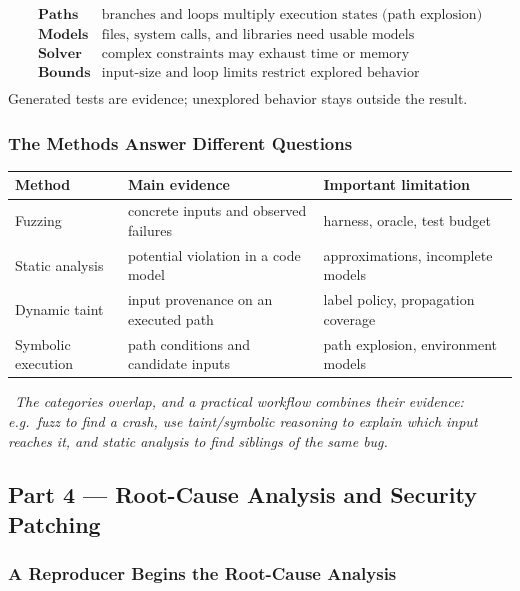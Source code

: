 \documentclass[hidelinks]{article}
\newcommand{\callout}[1]{\par\smallskip\noindent{\color{capri}$\blacktriangleright$}\ \textit{#1}\par\smallskip}
\begin{document}
\[
\begin{array}{ll}
\textbf{Paths}  & \text{branches and loops multiply execution states (path explosion)}\\
\textbf{Models} & \text{files, system calls, and libraries need usable models}\\
\textbf{Solver} & \text{complex constraints may exhaust time or memory}\\
\textbf{Bounds} & \text{input-size and loop limits restrict explored behavior}\\
\end{array}
\]
Generated tests are evidence; unexplored behavior stays outside the result.

\subsubsection{The Methods Answer Different Questions}

\begin{center}
\color{white}
\begin{tabular}{p{3.0cm}p{4.6cm}p{4.6cm}}
\hline
\textbf{Method} & \textbf{Main evidence} & \textbf{Important limitation}\\ \hline
Fuzzing & concrete inputs and observed failures & harness, oracle, test budget\\
Static analysis & potential violation in a code model & approximations, incomplete models\\
Dynamic taint & input provenance on an executed path & label policy, propagation coverage\\
Symbolic execution & path conditions and candidate inputs & path explosion, environment models\\ \hline
\end{tabular}
\end{center}

\callout{The categories overlap, and a practical workflow \emph{combines} their evidence: e.g.\ fuzz to find a crash, use taint/symbolic reasoning to explain which input reaches it, and static analysis to find siblings of the same bug.}

\subsection{Part 4 --- Root-Cause Analysis and Security Patching}

\subsubsection{A Reproducer Begins the Root-Cause Analysis}
\end{document}

